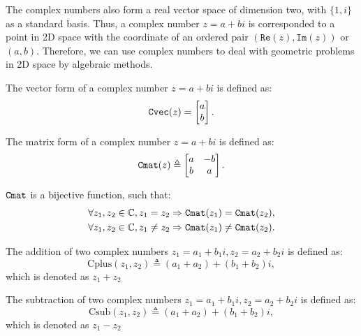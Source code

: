 \documentclass[runningheads,a4paper,english]{llncs}[2022/01/12]
\newcommand{\bC}{\mathbb{C}}
\newcommand{\bmatL}{\begin{bmatrix}}
\newcommand{\bmatR}{\end{bmatrix}}
\begin{document}
The complex numbers also form a real vector space of dimension two, with $\{1,i\}$ as a standard basis.
Thus, a complex number $z=a+bi$ is corresponded to a point in 2D space with the coordinate of an ordered pair $(\mathtt{Re}(z),\mathtt{Im}(z))$ or $(a,b)$.
Therefore, we can use complex numbers to deal with geometric problems in 2D space by algebraic methods.

\begin{definition}
  The vector form of a complex number $z=a+bi$ is defined as:
  \begin{equation}
    \Cvec{z}=\bmatL a\\b\bmatR.
  \end{equation}
\end{definition}

\begin{definition}
  The matrix form of a complex number $z=a+bi$ is defined as:
  \begin{equation}\label{complex_mult_alg}
    \Cmat{z}\triangleq \bmatL a&-b\\b&a\bmatR.
  \end{equation}
\end{definition}

\begin{lemma}
  $\Cmat$ is a bijective function, such that:
  \begin{gather}
    \forall z_1,z_2\in\bC, z_1=z_2\Rightarrow\Cmat{z_1}=\Cmat{z_2},\\
    \forall z_1,z_2\in\bC, z_1\neq z_2\Rightarrow\Cmat{z_1}\neq\Cmat{z_2}.
  \end{gather}
\end{lemma}

\begin{definition}
  The addition of two complex numbers $z_1=a_1+b_1i, z_2=a_2+b_2i$ is defined as:
  \begin{equation}
    \mathrm{Cplus}(z_1,z_2)\triangleq (a_1+a_2)+(b_1+b_2)i,
  \end{equation}
  which is denoted as $z_1+z_2$
\end{definition}

\begin{definition}
  The subtraction of two complex numbers $z_1=a_1+b_1i, z_2=a_2+b_2i$ is defined as:
  \begin{equation}
    \mathrm{Csub}(z_1,z_2)\triangleq (a_1+a_2)+(b_1+b_2)i,
  \end{equation}
  which is denoted as $z_1-z_2$
\end{definition}
\end{document}
